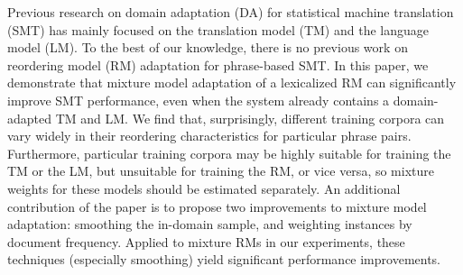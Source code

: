 Previous research on domain adaptation (DA) for statistical machine translation (SMT) has mainly focused on the translation model (TM) and the language model
 (LM). To the best of our knowledge, there is no previous work on reordering
 model (RM) adaptation for phrase-based SMT. In this paper, we demonstrate that
 mixture model adaptation of a lexicalized RM can significantly improve SMT
 performance, even when the system already contains a domain-adapted TM and LM.
 We find that, surprisingly, different training corpora can vary widely in
 their reordering characteristics for particular phrase pairs. Furthermore,
 particular training corpora may be highly suitable for training the TM or the
 LM, but unsuitable for training the RM, or vice versa, so mixture weights for
 these models should be estimated separately. An additional contribution of the
 paper is to propose two improvements to mixture model adaptation: smoothing the
 in-domain sample, and weighting instances by document frequency. Applied to
 mixture RMs in our experiments, these techniques (especially smoothing) yield
 significant performance improvements.

